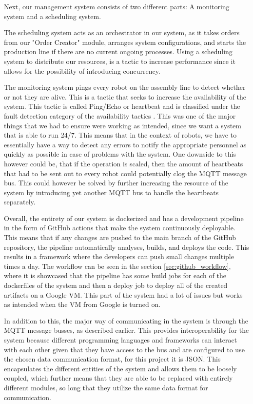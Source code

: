 Next, our management system consists of two different parts: A monitoring system and a scheduling system.

The scheduling system acts as an orchestrator in our system, as it takes orders from our "Order Creator" module, arranges system configurations, and starts the production line if there are no current ongoing processes.
Using a scheduling system to distribute our resources, is a tactic to increase performance since it allows for the possibility of introducing concurrency\cite{lenbassArchi}.

The monitoring system pings every robot on the assembly line to detect whether or not they are alive. 
This is a tactic that seeks to increase the availability of the system. This tactic is called Ping/Echo or heartbeat and is classified under the fault detection category of the availability tactics \cite{lenbassArchi}. This was one of the major things that we had to ensure were working as intended, since we want a system that is able to run 24/7. This means that in the context of robots, we have to essentially have a way to detect any errors to notify the appropriate personnel as quickly as possible in case of problems with the system. One downside to this however could be, that if the operation is scaled, then the amount of heartbeats that had to be sent out to every robot could potentially clog the MQTT message bus. This could however be solved by further increasing the resource of the system by introducing yet another MQTT bus to handle the heartbeats separately.   

Overall, the entirety of our system is dockerized and has a development pipeline in the form of GitHub actions that make the system continuously deployable. This means that if any changes are pushed to the main branch of the GitHub repository, the pipeline automatically analyses, builds, and deploys the code. This results in a framework where the developers can push small changes multiple times a day. The workflow can be seen in the section \ref{sec:github_workflow}, where it is showcased that the pipeline has some build jobs for each of the dockerfiles of the system and then a deploy job to deploy all of the created artifacts on a Google VM. This part of the system had a lot of issues but works as intended when the VM from Google is turned on.

In addition to this, the major way of communicating in the system is through the MQTT message busses, as described earlier. This provides interoperability for the system because different programming languages and frameworks can interact with each other given that they have access to the bus and are configured to use the chosen data communication format, for this project it is JSON.\cite{lenbassArchi} This encapsulates the different entities of the system and allows them to be loosely coupled, which further means that they are able to be replaced with entirely different modules, so long that they utilize the same data format for communication.

